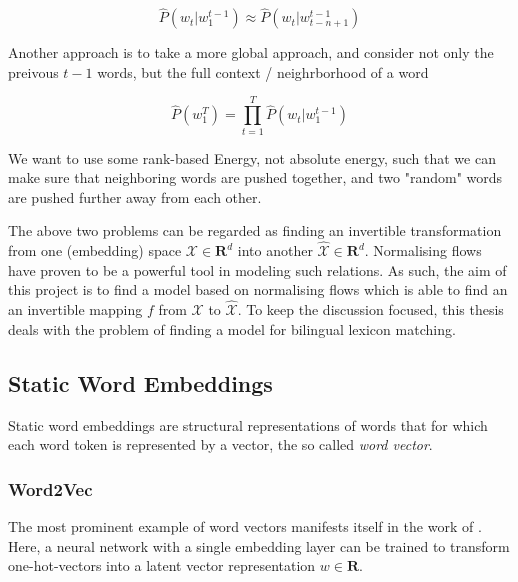 \documentclass[a4paper,12pt,twoside,openright]{report}
\begin{document}
\begin{equation}
\hat{P}\left(w_{t} | w_{1}^{t-1}\right) \approx \hat{P}\left(w_{t} | w_{t-n+1}^{t-1}\right)
\end{equation}

Another approach is to take a more global approach, and consider not only the preivous $t-1$ words, but the full context / neighrborhood of a word

\begin{equation}
\hat{P}\left(w_{1}^{T}\right)=\prod_{t=1}^{T} \hat{P}\left(w_{t} | w_{1}^{t-1}\right)
\end{equation}{\label{eq:previous_words}}


We want to use some rank-based Energy, not absolute energy, such that we can make sure that neighboring words are pushed together, and two "random" words are pushed further away from each other.

The above two problems can be regarded as finding an invertible transformation from one (embedding) space $\mathcal{X} \in \mathbf{R}^d$ into another $\mathcal{\hat{X}} \in \mathbf{R}^d$. 
Normalising flows \cite{variational_inference_using_normalized_flows} \cite{nvp} have proven to be a powerful tool in modeling such relations.
As such, the aim of this project is to find a model based on normalising flows which is able to find an an invertible mapping $f$ from $\mathcal{X}$ to $\mathcal{\hat{X}}$.
To keep the discussion focused, this thesis deals with the problem of finding a model for bilingual lexicon matching.

\subsection{Static Word Embeddings}

Static word embeddings are structural representations of words that for which each word token is represented by a vector, the so called \textit{word vector}.

\subsubsection{Word2Vec}

The most prominent example of word vectors manifests itself in the work of \cite{mikolov13}.
Here, a neural network with a single embedding layer can be trained to transform one-hot-vectors into a latent vector representation $w \in \mathbf{R}$.
\end{document}
